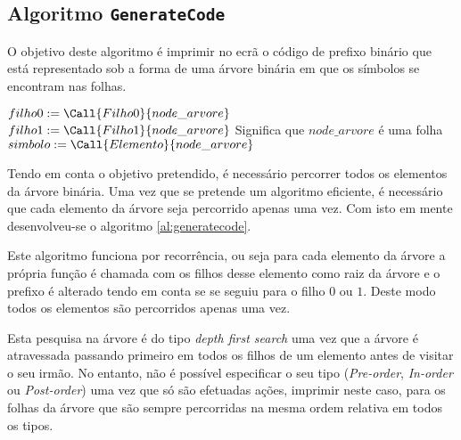 \documentclass{article}
\begin{document}

\setcounter{page}{1}

\subsection{Algoritmo \texttt{GenerateCode}}

O objetivo deste algoritmo é imprimir no ecrã o código de prefixo binário que está representado sob a forma de uma árvore binária em que os símbolos se encontram nas folhas.

\begin{algorithm}[H]
\caption{}
\label{al:generatecode}
\begin{algorithmic}
	\State $filho0 := \Call{Filho0}{node\_arvore}$
	\State $filho1 := \Call{Filho1}{node\_arvore}$
	\State
		\State {}
	\EndIf
		\State {}
	\EndIf
	\State
	 \Comment Significa que $node\_arvore$ é uma folha
		\State $simbolo := \Call{Elemento}{node\_arvore}$
		\State {}
	\EndIf

\EndFunction
\end{algorithmic}
\end{algorithm}

Tendo em conta o objetivo pretendido, é necessário percorrer todos os elementos da árvore binária. Uma vez que se pretende um algoritmo eficiente, é necessário que cada elemento da árvore seja percorrido apenas uma vez. Com isto em mente desenvolveu-se o algoritmo \ref{al:generatecode}. 

Este algoritmo funciona por recorrência, ou seja para cada elemento da árvore a própria função é chamada com os filhos desse elemento como raiz da árvore e o prefixo é alterado tendo em conta se se seguiu para o filho $0$ ou $1$. Deste modo todos os elementos são percorridos apenas uma vez.

Esta pesquisa na árvore é do tipo \textit{depth first search} uma vez que a árvore é atravessada passando primeiro em todos os filhos de um elemento antes de visitar o seu irmão. No entanto, não é possível especificar o seu tipo (\textit{Pre-order}, \textit{In-order} ou \textit{Post-order}) uma vez que só são efetuadas ações, imprimir neste caso, para os folhas da árvore que são sempre percorridas na mesma ordem relativa em todos os tipos.
\end{document}

